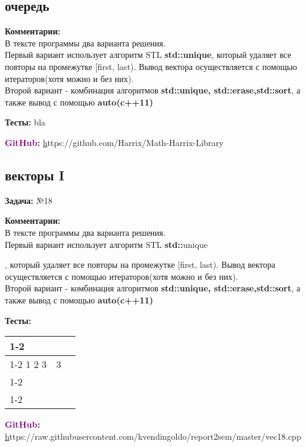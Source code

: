 \documentclass[a4paper,,titlepage]{report}
\newcommand{\gitlink}[1]{\textsf{\textbf {\textcolor{purple}{GitHub}:  }}\selectfont \href{}#1\par}
\newcommand{\comments}[1]{\textsf{\textbf {Комментарии:  }}#1\par}
\newcommand{\tests}[1]{\textsf{\textbf {Тесты:  }}#1\par}
\newcommand{\tasknumber}[1]{\textsf{\textbf {Задача: }} №#1\par}
\newcommand{\stl}[1]{\textsf{\textbf {std::}}#1\par}
\begin{document}
\begin{center}\section{очередь}\end{center}
 
 \begin{flushleft}
\comments
{
\\
В тексте программы два варианта решения. 
\\Первый вариант использует алгоритм STL \textbf {std::unique}, который удаляет все повторы на промежутке [first, last). Вывод вектора осуществляется с помощью итераторов(хотя можно и без них).
\\Второй вариант - комбинация алгоритмов \textbf {std::unique, std::erase,std::sort}, а также вывод с помощью \textbf {auto(c++11)} 

}
\tests{bla} 
\gitlink{https://github.com/Harrix/Math-Harrix-Library}
\end{flushleft}


\begin{center}\section{векторы I}\end{center}
 
 \begin{flushleft}
 
 \tasknumber{18}
\comments
	{
	\\
	В тексте программы два варианта решения. 
	\\Первый вариант использует алгоритм STL \stl{unique}, который удаляет все повторы на промежутке [first, last). Вывод вектора осуществляется с помощью итераторов(хотя можно и без них).
	\\Второй вариант - комбинация алгоритмов \textbf {std::unique, std::erase,std::sort}, а также вывод с помощью \textbf {auto(c++11)} 
	}
\tests
	{
	\\ 
	\begin{table}[h]
	\begin{tabular}{|l|l|l}
	\cline{1-2}
	\multicolumn{2}{|l|}{тесты} &  \\ \cline{1-2}
		  1 2 3     &     3      &  \\ \cline{1-2}
		       &           &  \\ \cline{1-2}
	\end{tabular}
	\end{table}

	} 
\gitlink{https://raw.githubusercontent.com/kvendingoldo/report2sem/master/vec18.cpp}
\end{flushleft}
\end{document}

